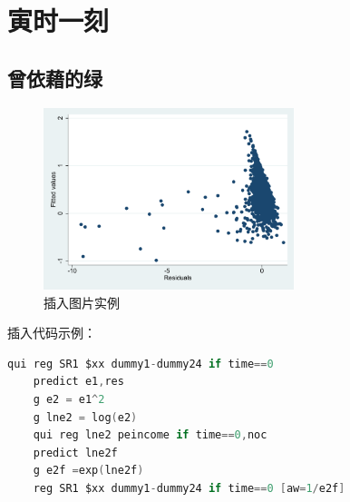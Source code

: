 
\chapter{寅时一刻}
\section{曾依藉的绿}
\begin{figure}[H]
    \centering
    \includegraphics[width=0.65\textwidth]{figure/cancha.pdf}
    \caption[Caption for LOF]{插入图片实例\protect\footnotemark}
\end{figure}

插入代码示例：
\begin{lstlisting}[language=C]
    qui reg SR1 $xx dummy1-dummy24 if time==0
    predict e1,res
    g e2 = e1^2
    g lne2 = log(e2)
    qui reg lne2 peincome if time==0,noc
    predict lne2f
    g e2f =exp(lne2f)
    reg SR1 $xx dummy1-dummy24 if time==0 [aw=1/e2f]
\end{lstlisting}
